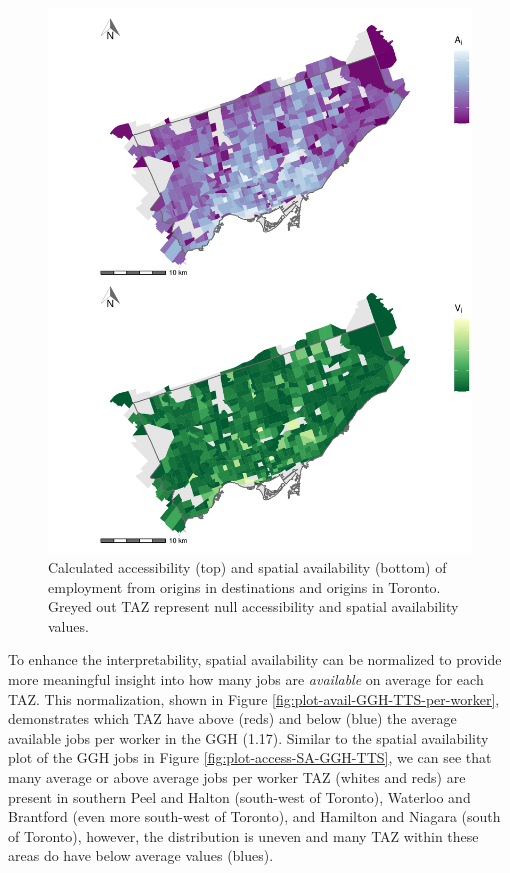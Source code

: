 \documentclass[]{elsarticle} %
\begin{document}
\begin{figure}
\includegraphics[width=1\linewidth]{Spatial-Availability-Refreshed_files/figure-latex/plot-access-SA-TO-1} \caption{\label{fig:plot-access-SA-TO}Calculated accessibility (top) and spatial availability (bottom) of employment from origins in destinations and origins in Toronto. Greyed out TAZ represent null accessibility and spatial availability values.}\label{fig:plot-access-SA-TO}
\end{figure}

To enhance the interpretability, spatial availability can be normalized
to provide more meaningful insight into how many jobs are
\emph{available} on average for each TAZ. This normalization, shown in
Figure \ref{fig:plot-avail-GGH-TTS-per-worker}, demonstrates which TAZ
have above (reds) and below (blue) the average available jobs per worker
in the GGH (1.17). Similar to the spatial availability plot of the GGH
jobs in Figure \ref{fig:plot-access-SA-GGH-TTS}, we can see that many
average or above average jobs per worker TAZ (whites and reds) are
present in southern Peel and Halton (south-west of Toronto), Waterloo
and Brantford (even more south-west of Toronto), and Hamilton and
Niagara (south of Toronto), however, the distribution is uneven and many
TAZ within these areas do have below average values (blues).
\end{document}
